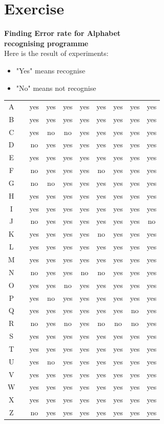 \documentclass[11pt,a4paper]{article}
\begin{document}
	\section{Exercise}
	\textbf{\huge{Finding Error rate for Alphabet\\recognising programme}}
	\vspace{1cm}\\
	Here is the result of experiments:
	\begin{center}
    \begin{itemize}
        \item "Yes" means recognise
        \item "No" means not recognise
    \end{itemize}
	\vspace{1cm}
    \begin{tabular}{c|c|c|c|c|c|c|c|c|c}
    \hline
         A& &yes&yes&yes&yes&yes&yes&yes&yes\\ 
         B& &yes&yes&yes&yes&yes&yes&yes&yes\\
         C& &yes&no&no&yes&yes&yes&yes&yes\\
         D& &no&yes&yes&yes&yes&yes&yes&yes\\
         E& &yes&yes&yes&yes&yes&yes&yes&yes\\
         F& &no&yes&yes&yes&no&yes&yes&yes\\
         G& &no&no&yes&yes&yes&yes&yes&yes\\
         H& &yes&yes&yes&yes&yes&yes&yes&yes\\
         I& &yes&yes&yes&yes&yes&yes&yes&yes\\
         J& &no&yes&yes&yes&yes&yes&yes&no\\
         K& &yes&yes&yes&yes&no&yes&yes&yes\\
         L& &yes&yes&yes&yes&yes&yes&yes&yes\\
         M& &yes&yes&yes&yes&yes&yes&yes&yes\\
         N& &no&yes&yes&no&no&yes&yes&yes\\
         O& &yes&yes&no&yes&yes&yes&yes&yes\\
         P& &yes&no&yes&yes&yes&yes&yes&yes\\
         Q& &yes&yes&yes&yes&yes&yes&no&yes\\
         R& &no&yes&no&yes&no&no&no&yes\\
         S& &yes&yes&yes&yes&yes&yes&yes&yes\\
         T& &yes&yes&yes&yes&yes&yes&yes&yes\\
         U& &yes&no&yes&yes&yes&yes&yes&yes\\
         V& &yes&yes&yes&yes&yes&yes&yes&yes\\
         W& &yes&yes&yes&yes&yes&yes&yes&yes\\
         X& &yes&yes&yes&yes&yes&yes&yes&yes\\
         Z& &no&yes&yes&yes&yes&yes&yes&yes\\
         
    \hline
    \end{tabular}
    \end{center}
\end{document}
